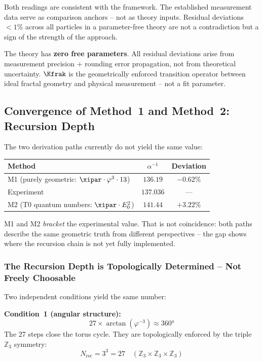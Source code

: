 Both readings are consistent with the framework. The established measurement data serve as comparison anchors -- not as theory inputs. Residual deviations $< 1\%$ across all particles in a parameter-free theory are not a contradiction but a sign of the strength of the approach.

\begin{tcolorbox}[colback=T0gray, colframe=T0blue, title=Core statement on precision]
The theory has \textbf{zero free parameters}. All residual deviations arise from measurement precision + rounding error propagation, not from theoretical uncertainty. $\Kfrak$ is the geometrically enforced transition operator between ideal fractal geometry and physical measurement -- not a fit parameter.
\end{tcolorbox}

\subsection{Convergence of Method~1 and Method~2: Recursion Depth}

The two derivation paths currently do not yield the same value:

\begin{center}
{\footnotesize
\begin{tabular}{lcc}
\toprule
Method & $\alpha^{-1}$ & Deviation \\
\midrule
M1 (purely geometric: $\xipar\cdot\varphi^3\cdot 13$) & $136.19$ & $-0.62\%$ \\
Experiment & $137.036$ & --- \\
M2 (T0 quantum numbers: $\xipar\cdot E_0^2$) & $141.44$ & $+3.22\%$ \\
\bottomrule
\end{tabular}
} %
\end{center}

M1 and M2 \emph{bracket} the experimental value. That is not coincidence: both paths describe the same geometric truth from different perspectives -- the gap shows where the recursion chain is not yet fully implemented.

\subsubsection*{The Recursion Depth is Topologically Determined -- Not Freely Choosable}

Two independent conditions yield the same number:

\textbf{Condition~1 (angular structure):}
\[
  27 \times \arctan(\varphi^{-3}) \approx 360°
\]
The 27 steps close the torus cycle. They are topologically enforced by the triple $\mathbb{Z}_3$ symmetry:
\[
  N_{\text{rec}} = 3^3 = 27 \quad (\mathbb{Z}_3 \times \mathbb{Z}_3 \times \mathbb{Z}_3)
\]

